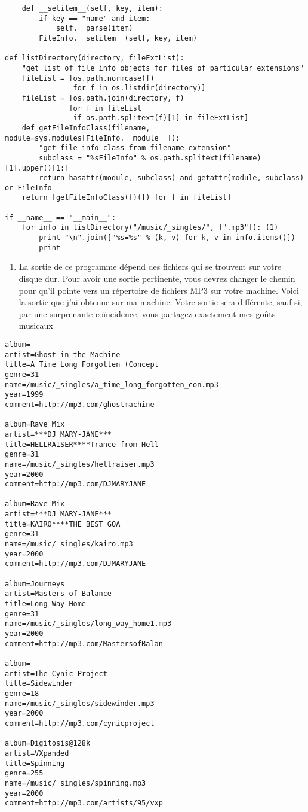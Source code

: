 \begin{example}[fileinfo.py]
\begin{lstlisting}
    def __setitem__(self, key, item):
        if key == "name" and item:
            self.__parse(item)
        FileInfo.__setitem__(self, key, item)

def listDirectory(directory, fileExtList):
    "get list of file info objects for files of particular extensions"
    fileList = [os.path.normcase(f)
                for f in os.listdir(directory)]
    fileList = [os.path.join(directory, f)
               for f in fileList
                if os.path.splitext(f)[1] in fileExtList]
    def getFileInfoClass(filename, module=sys.modules[FileInfo.__module__]):
        "get file info class from filename extension"
        subclass = "%sFileInfo" % os.path.splitext(filename)[1].upper()[1:]
        return hasattr(module, subclass) and getattr(module, subclass) or FileInfo
    return [getFileInfoClass(f)(f) for f in fileList]

if __name__ == "__main__":
    for info in listDirectory("/music/_singles/", [".mp3"]): (1)
        print "\n".join(["%s=%s" % (k, v) for k, v in info.items()])
        print
\end{lstlisting}
\end{example}

\begin{enumerate}
\item{La sortie de ce programme dépend des fichiers qui se trouvent sur votre disque dur. Pour avoir une sortie pertinente, vous devrez changer le chemin pour qu'il pointe vers un répertoire de fichiers MP3 sur votre machine. Voici la sortie que j'ai obtenue sur ma machine. Votre sortie sera différente, sauf si, par une surprenante coïncidence, vous partagez exactement mes goûts musicaux}
\end{enumerate}

\begin{verbatim}
album=
artist=Ghost in the Machine
title=A Time Long Forgotten (Concept
genre=31
name=/music/_singles/a_time_long_forgotten_con.mp3
year=1999
comment=http://mp3.com/ghostmachine

album=Rave Mix
artist=***DJ MARY-JANE***
title=HELLRAISER****Trance from Hell
genre=31
name=/music/_singles/hellraiser.mp3
year=2000
comment=http://mp3.com/DJMARYJANE

album=Rave Mix
artist=***DJ MARY-JANE***
title=KAIRO****THE BEST GOA
genre=31
name=/music/_singles/kairo.mp3
year=2000
comment=http://mp3.com/DJMARYJANE

album=Journeys
artist=Masters of Balance
title=Long Way Home
genre=31
name=/music/_singles/long_way_home1.mp3
year=2000
comment=http://mp3.com/MastersofBalan

album=
artist=The Cynic Project
title=Sidewinder
genre=18
name=/music/_singles/sidewinder.mp3
year=2000
comment=http://mp3.com/cynicproject

album=Digitosis@128k
artist=VXpanded
title=Spinning
genre=255
name=/music/_singles/spinning.mp3
year=2000
comment=http://mp3.com/artists/95/vxp
\end{verbatim}

